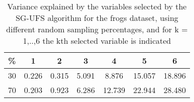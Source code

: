 \begin{table}
	\begin{center}
		\begin{tabular}{c c c c c c c}
			\% & 1 & 2 & 3 & 4 & 5 & 6 \\
			\hline
			30 & 0.226 & 0.315 & 5.091 & 8.876 & 15.057 & 18.896 \\
			70 & 0.203 & 0.923 & 6.286 & 12.739 & 22.944 & 28.480 \\
		\end{tabular}
	\end{center}
	\caption{Variance explained by the variables selected by the SG-UFS algorithm for the frogs dataset, using different random sampling percentages, and for k = 1,..,6 the kth selected variable is indicated}
\end{table}